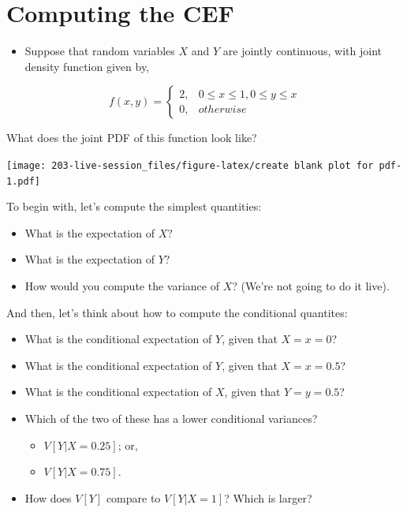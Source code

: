 \documentclass[
]{book}
\providecommand{\tightlist}{%
  \setlength{\itemsep}{0pt}\setlength{\parskip}{0pt}}
\theoremstyle{definition}
\theoremstyle{definition}
\theoremstyle{definition}
\theoremstyle{definition}
\theoremstyle{remark}
\begin{document}
\hypertarget{computing-the-cef}{%
\section{Computing the CEF}\label{computing-the-cef}}

\begin{itemize}
\tightlist
\item
  Suppose that random variables \(X\) and \(Y\) are jointly continuous, with joint density function given by,
\end{itemize}

\[
f(x,y) = 
  \begin{cases}
    2, & 0 \leq x \leq 1, 0 \leq y \leq x \\
    0, & otherwise
\end{cases}
\]

What does the joint PDF of this function look like?

\texttt{[image: 203-live-session\_files/figure-latex/create blank plot for pdf-1.pdf]}

To begin with, let's compute the simplest quantities:

\begin{itemize}
\tightlist
\item
  What is the expectation of \(X\)?
\item
  What is the expectation of \(Y\)?
\item
  How would you compute the variance of \(X\)? (We're not going to do it live).
\end{itemize}

And then, let's think about how to compute the conditional quantites:

\begin{itemize}
\tightlist
\item
  What is the conditional expectation of \(Y\), given that \(X=x=0\)?
\item
  What is the conditional expectation of \(Y\), given that \(X=x=0.5\)?
\item
  What is the conditional expectation of \(X\), given that \(Y=y=0.5\)?
\item
  Which of the two of these has a lower conditional variances?

  \begin{itemize}
  \tightlist
  \item
    \(V[Y|X=0.25]\); or,
  \item
    \(V[Y|X=0.75]\).
  \end{itemize}
\item
  How does \(V[Y]\) compare to \(V[Y|X=1]\)? Which is larger?
\end{itemize}
\end{document}
